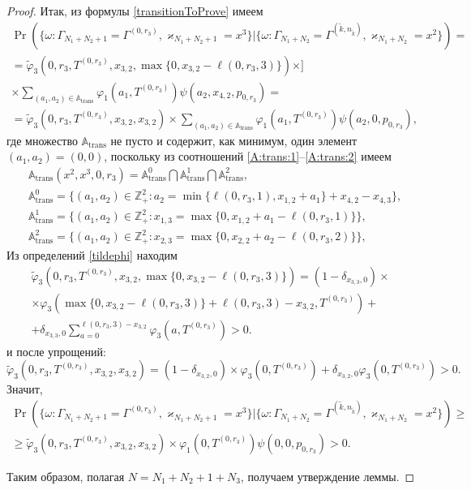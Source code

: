 \documentclass[a4paper,12pt,russian]{extarticle}
\begin{document}
\begin{proof}
Итак, из формулы \eqref{transitionToProve} имеем
\begin{multline*}
\Pr(\{\omega\colon \Gamma_{N_1+N_2+1}=\Gamma^{(0,r_3)}, \varkappa_{N_1+N_2+1}=x^{3}\}|\{\omega\colon 
\Gamma_{N_1+N_2}=\Gamma^{(\tilde{k},n_{\tilde{k}})}, \varkappa_{N_1+N_2}=x^2\})=\\
=\widetilde{\varphi}_3(0,r_3,T^{(0,r_3)},x_{3,2},\max{\{0,x_{3,2} - \ell(0,r_3,3)\}}) \times]\\ \times
\sum_{(a_1,a_2)\in {\mathbb A}_{\mathrm{trans}}}\varphi_1(a_1,T^{(0,r_3)})  \psi(a_2,x_{4,2}, p_{0,r_3}) =\\
=\widetilde{\varphi}_3(0,r_3,T^{(0,r_3)},x_{3,2},x_{3,2}) \times
\sum_{(a_1,a_2)\in {\mathbb A}_{\mathrm{trans}}}\varphi_1(a_1,T^{(0,r_3)})  \psi(a_2,0, p_{0,r_3}),
\end{multline*}
где множество ${\mathbb A}_{\mathrm{trans}}$ не пусто и содержит, как минимум, один элемент $(a_1,a_2)=(0,0)$, поскольку из соотношений \eqref{A:trans:1}--\eqref{A:trans:2} имеем
\begin{align*}
&{\mathbb A}_{\mathrm{trans}}(x^2,x^{3},0,r_3) = {\mathbb A}_{\mathrm{trans}}^0 \bigcap {\mathbb A}_{\mathrm{trans}}^1\bigcap {\mathbb A}_{\mathrm{trans}}^2,\\
&{\mathbb A}_{\mathrm{trans}}^0 = \{(a_1,a_2) \in \mathbb{Z}_+^2 \colon a_2 = \min{\{\ell(0,r_3,1), x_{1,2}+a_1}\} +x_{4,2}- x_{4,3}\},\\
&{\mathbb A}_{\mathrm{trans}}^1 = \{(a_1,a_2) \in \mathbb{Z}_+^2 \colon x_{1,3}=\max{\{0,x_{1,2}+a_1-\ell(0,r_3,1)\}}\},\\
& {\mathbb A}_{\mathrm{trans}}^2 = \{(a_1,a_2) \in \mathbb{Z}_+^2 \colon  x_{2,3} =\max{\{0,x_{2,2}+a_2-\ell(0,r_3,2)\}}\},
\end{align*}
Из определений \eqref{tildephi} находим
\begin{multline*}
\widetilde{\varphi}_3(0,r_3,T^{(0,r_3)},x_{3,2},\max{\{0,x_{3,2} - \ell(0,r_3,3)\}})= (1-\delta_{x_{3,3},0}) \times \\\times\varphi_3(\max{\{0,x_{3,2} - \ell(0,r_3,3)\}} + \ell (0,r_3,3) - x_{3,2},T^{(0,r_3)} ) 
+\\+\delta_{x_{3,3},0} \sum_{a=0}^{\ell(0,r_3,3)-x_{3,2}}\varphi_3 (a,T^{(0,r_3)})>0.
\end{multline*}
и после упрощений:
\begin{equation*}
\widetilde{\varphi}_3(0,r_3,T^{(0,r_3)},x_{3,2},x_{3,2})= (1-\delta_{x_{3,2},0}) \times \varphi_3(0,T^{(0,r_3)} ) 
+\delta_{x_{3,2},0} \varphi_3 (0,T^{(0,r_3)})>0.
\end{equation*}
Значит,
\begin{multline*}
\Pr(\{\omega\colon \Gamma_{N_1+N_2+1}=\Gamma^{(0,r_3)}, \varkappa_{N_1+N_2+1}=x^{3}\}|\{\omega\colon 
\Gamma_{N_1+N_2}=\Gamma^{(\tilde{k},n_{\tilde{k}})}, \varkappa_{N_1+N_2}=x^2\})\geqslant \\
\geqslant \widetilde{\varphi}_3(0,r_3,T^{(0,r_3)},x_{3,2},x_{3,2})
\times
\varphi_1(0,T^{(0,r_3)})  \psi(0,0, p_{0,r_3}) > 0.
\end{multline*}

Таким образом, полагая $N=N_1+N_2+1+N_3$, получаем утверждение леммы.
\end{proof}
\end{document}
